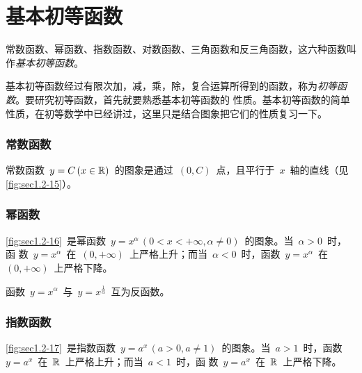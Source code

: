 \section{基本初等函数}

常数函数、幂函数、指数函数、对数函数、三角函数和反三角函数，这六种函数叫作\emph{基本初等函数}。

基本初等函数经过有限次加，减，乘，除，复合运算所得到的函数，称为\emph{初等函数}。要研究初等函数，首先就要熟悉基本初等函数的
性质。基本初等函数的简单性质，在初等数学中已经讲过，这里只是结合图象把它们的性质复习一下。

\subsubsection{常数函数}

常数函数~$y=C\,(x\in\mathbb{R})$~的图象是通过~$(0,C)$~点，且平行于~$x$~轴的直线（见\ref{fig:sec1.2-15}）。

\subsubsection{幂函数}

\ref{fig:sec1.2-16}~是幂函数~$y=x^\alpha\,(0<x<+\infty,\alpha\neq0)$~的图象。当~$\alpha>0$~时，函
数~$y=x^\alpha$~在~$(0,+\infty)$~上严格上升；而当~$\alpha<0$~时，函数~$y=x^\alpha$~在~$(0,+\infty)$~上严格下降。

函数~$y=x^\alpha$~与~$y=x^{\frac1\alpha}$~互为反函数。

\begin{figure}
\begin{floatrow}
\begin{minipage}{.4\hsize}
          {\somefigure}
          {\somefigure}
\end{minipage}\qquad
\begin{minipage}{.4\hsize}
          {\somefigure}
          {\somefigure}
\end{minipage}
\end{floatrow}
\end{figure}

\subsubsection{指数函数}

\ref{fig:sec1.2-17}~是指数函数~$y=a^x\,(a>0,a\neq1)$~的图象。当~$a>1$~时，函数~$y=a^x$~在~$\mathbb{R}$~上严格上升；而当~$a<1$~时，函
数~$y=a^x$~在~$\mathbb{R}$~上严格下降。

